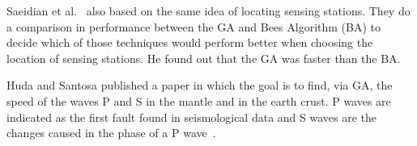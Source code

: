 Saeidian et al.~\cite{saeidian2016evaluation} also based on the same idea of locating sensing stations. They do a comparison in performance between the GA and Bees Algorithm (BA) to decide which of those techniques would perform better when choosing the location of sensing stations. He found out that the GA was faster than the BA.


Huda and Santosa \cite{ijse5762} published a paper in which the goal is to find, via GA, the speed of the waves P and S in the mantle and in the earth crust. P waves are indicated as the first fault found in seismological data and S waves are the changes caused in the phase of a P wave~\cite{ijse5762}. %


